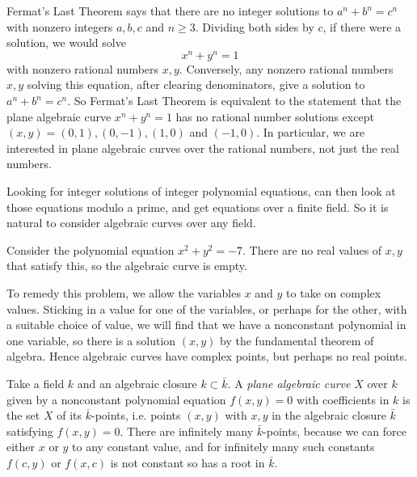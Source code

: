\begin{example}
Fermat's Last Theorem says that there are no integer solutions to \(a^n+b^n=c^n\) with nonzero integers \(a,b,c\) and \(n\ge 3\).
Dividing both sides by \(c\), if there were a solution, we would solve 
\[
x^n+y^n=1
\]
with nonzero rational numbers \(x,y\).
Conversely, any nonzero rational numbers \(x,y\) solving this equation, after clearing denominators, give a solution to \(a^n+b^n=c^n\).
So Fermat's Last Theorem is equivalent to the statement that the plane algebraic curve \(x^n+y^n=1\) has no rational number solutions except \((x,y)=(0,1), (0,-1), (1,0)\) and \((-1,0)\).
In particular, we are interested in plane algebraic curves over the rational numbers, not just the real numbers.
\end{example}
\begin{example}
Looking for integer solutions of integer polynomial equations, can then look at those equations modulo a prime, and get equations over a finite field. 
So it is natural to consider algebraic curves over any field.
\end{example}
\begin{example}
Consider the polynomial equation \(x^2+y^2=-7\).
There are no real values of \(x,y\) that satisfy this, so the algebraic curve is empty.
\end{example}
To remedy this problem, we allow the variables \(x\) and \(y\) to take on complex values.
Sticking in a value for one of the variables, or perhaps for the other, with a suitable choice of value, we will find that we have a nonconstant polynomial in one variable, so there is a solution \((x,y)\) by the fundamental theorem of algebra.
Hence algebraic curves have complex points, but perhaps no real points.

Take a field \(k\) and an algebraic closure \(k\subset \bar{k}\).
A \emph{plane algebraic curve} \(X\) over \(k\) given by a nonconstant polynomial equation \(f(x,y)=0\) with coefficients in \(k\) is the set \(X\) of its \(\bar{k}\)-points, i.e. points \((x,y)\) with \(x,y\) in the algebraic closure \(\bar{k}\) satisfying \(f(x,y)=0\).
There are infinitely many \(\bar{k}\)-points, because we can force either \(x\) or \(y\) to any constant value, and for infinitely many such constants \(f(c,y)\) or \(f(x,c)\) is not constant so has a root in \(\bar{k}\).

